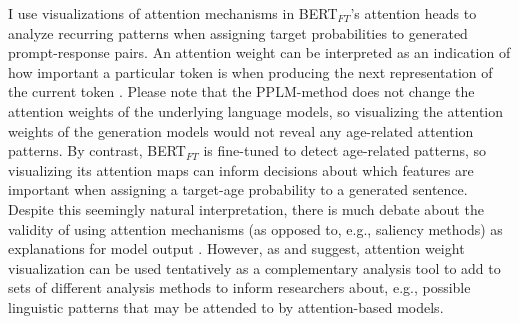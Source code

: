 
I use visualizations of attention mechanisms \citep{vig-2019-multiscale} in BERT$_{FT}$'s attention heads to analyze recurring patterns when assigning target probabilities to generated prompt-response pairs. An attention weight can be interpreted as an indication of how important a particular token is when producing the next representation of the current token \citep{DBLP:journals/corr/BahdanauCB14, clark-etal-2019-bert}. Please note that the PPLM-method does not change the attention weights of the underlying language models, so visualizing the attention weights of the generation models would not reveal any age-related attention patterns. By contrast, BERT$_{FT}$ is fine-tuned to detect age-related patterns, so visualizing its attention maps can inform decisions about which features are important when assigning a target-age probability to a generated sentence. Despite this seemingly natural interpretation, there is much debate about the validity of using attention mechanisms (as opposed to, e.g., saliency methods) as explanations for model output \citep{jain-wallace-2019-attention, wiegreffe-pinter-2019-attention, bastings-filippova-2020-elephant}. However, as \cite{vig-2019-multiscale} and \cite{clark-etal-2019-bert} suggest, attention weight visualization can be used tentatively as a complementary analysis tool to add to sets of different analysis methods to inform researchers about, e.g., possible linguistic patterns that may be attended to by attention-based models.

